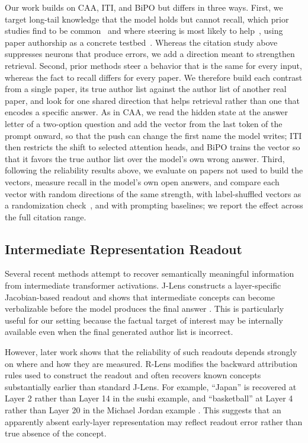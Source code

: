 \documentclass[sigconf,nonacm]{acmart}
\begin{document}
Our work builds on CAA, ITI, and BiPO but differs in three ways. First, we target long-tail knowledge that the model holds but cannot recall, which prior studies find to be common~\cite{gekhman2025insideout,calderon2026emptyshelves} and where steering is most likely to help~\cite{simhi2025hack}, using paper authorship as a concrete testbed~\cite{zhong2026dreaming}. Whereas the citation study above suppresses neurons that produce errors, we add a direction meant to strengthen retrieval. Second, prior methods steer a behavior that is the same for every input, whereas the fact to recall differs for every paper. We therefore build each contrast from a single paper, its true author list against the author list of another real paper, and look for one shared direction that helps retrieval rather than one that encodes a specific answer. As in CAA, we read the hidden state at the answer letter of a two-option question and add the vector from the last token of the prompt onward, so that the push can change the first name the model writes; ITI then restricts the shift to selected attention heads, and BiPO trains the vector so that it favors the true author list over the model's own wrong answer. Third, following the reliability results above, we evaluate on papers not used to build the vectors, measure recall in the model's own open answers, and compare each vector with random directions of the same strength, with label-shuffled vectors as a randomization check~\cite{adebayo2018sanity}, and with prompting baselines; we report the effect across the full citation range.

\subsection{Intermediate Representation Readout}
Several recent methods attempt to recover semantically meaningful
information from intermediate transformer activations. J-Lens constructs
a layer-specific Jacobian-based readout and shows that intermediate
concepts can become verbalizable before the model produces the final
answer \cite{gurnee2026verbalizable}. This is particularly useful for
our setting because the factual target of interest may be internally
available even when the final generated author list is incorrect.
 
However, later work shows that the reliability of such readouts depends
strongly on where and how they are measured. R-Lens modifies the backward
attribution rules used to construct the readout and often recovers known
concepts substantially earlier than standard J-Lens. For example,
``Japan'' is recovered at Layer 2 rather than Layer 14 in the sushi
example, and ``basketball'' at Layer 4 rather than Layer 20 in the
Michael Jordan example \cite{blank2026rlens}. This suggests that an
apparently absent early-layer representation may reflect readout error
rather than true absence of the concept.
 
\end{document}
